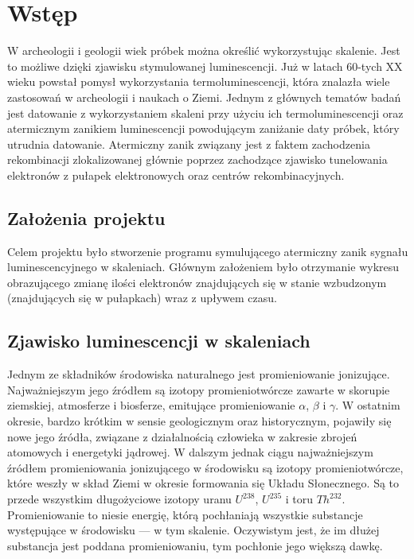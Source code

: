 \chapter{Wstęp}
W archeologii i geologii wiek próbek można określić wykorzystując skalenie. Jest to możliwe dzięki zjawisku stymulowanej luminescencji. Już w latach 60-tych  XX wieku powstał pomysł wykorzystania termoluminescencji, która znalazła wiele zastosowań w archeologii i naukach o Ziemi. Jednym z głównych tematów badań jest datowanie z wykorzystaniem skaleni przy użyciu ich termoluminescencji oraz atermicznym zanikiem luminescencji powodującym zaniżanie daty próbek, który utrudnia datowanie. Atermiczny zanik związany jest z faktem zachodzenia rekombinacji zlokalizowanej głównie poprzez zachodzące zjawisko tunelowania elektronów z pułapek elektronowych oraz centrów rekombinacyjnych. 

\section{Założenia projektu}
Celem projektu było stworzenie programu symulującego atermiczny zanik sygnału luminescencyjnego w skaleniach. Głównym założeniem było otrzymanie wykresu obrazującego zmianę ilości elektronów znajdujących się w stanie wzbudzonym (znajdujących się w pułapkach) wraz z upływem czasu.

\section{Zjawisko luminescencji w skaleniach}


Jednym ze składników środowiska naturalnego jest promieniowanie jonizujące. Najważniejszym jego źródłem są izotopy promieniotwórcze zawarte w skorupie ziemskiej, atmosferze
i biosferze, emitujące promieniowanie $\alpha$, $\beta$ i $\gamma$. 
W ostatnim okresie, bardzo krótkim w sensie geologicznym oraz historycznym, pojawiły
się nowe jego źródła, związane z działalnością człowieka w zakresie zbrojeń atomowych
i energetyki jądrowej. W dalszym jednak ciągu najważniejszym źródłem promieniowania
jonizującego w środowisku są izotopy promieniotwórcze, które weszły w skład Ziemi w okresie
formowania się Układu Słonecznego.  Są to przede wszystkim długożyciowe izotopy uranu $U^{238}$, $U^{235}$ i toru $Th^{232}$. Promieniowanie to niesie energię, którą pochłaniają wszystkie substancje występujące
w środowisku --- w tym skalenie. Oczywistym jest, że im dłużej substancja  jest poddana promieniowaniu, tym pochłonie jego większą dawkę.

